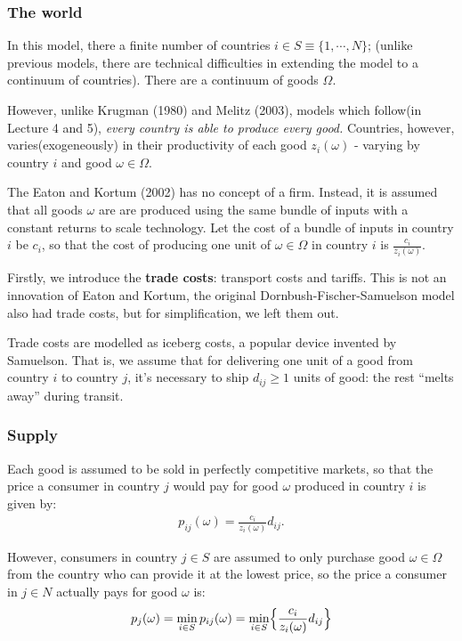 \subsubsection{The world}

In this model, there a finite number of countries $i \in S \equiv \{1, \cdots, N\}$; 
(unlike previous models, there are technical difficulties in extending the model to a continuum of countries).
There are a continuum of goods $\Omega$.

However, unlike Krugman (1980)\cite{krugman1980scale} and Melitz (2003)\cite{melitz2003impact}, models which follow(in Lecture 4 and 5),
\textit{every country is able to produce every good.}
Countries, however, varies(exogeneously) in their productivity of each good $z_i(\omega)$ - varying by country $i$ and good $\omega \in \Omega$.

The Eaton and Kortum (2002)\cite{eaton2002technology} has no concept of a firm. Instead, it is assumed that all
goods $\omega$ are are produced using the same bundle of inputs with a constant returns to
scale technology. Let the cost of a bundle of inputs in country $i$ be $c_i$,
so that the cost of producing one unit of $\omega \in \Omega$ in country $i$ is $\frac{c_i}{z_i(\omega)}$.

Firstly, we introduce the \textbf{trade costs}: transport costs and tariffs. This is not an innovation of Eaton
and Kortum, the original Dornbush-Fischer-Samuelson model also had trade costs, but for simplification, we left them out.
    
Trade costs are modelled as iceberg costs, a popular device invented by Samuelson\cite{samuelson1954transfer}.
That is, we assume that for delivering one unit of a good from country $i$ to country $j$, 
it's necessary to ship $d_{ij} \geq 1$ units of good: the rest “melts away” during transit. 

\subsubsection{Supply}

Each good is assumed to be sold in perfectly competitive markets, so that the price a
consumer in country $j$ would pay for good $\omega$ produced in country $i$ is given by:
\begin{gather*}
    p_{ij}(\omega) = \frac{c_i}{z_i(\omega)} d_{ij}. \label{eq:EKprice}
\end{gather*}

However, consumers in country $j \in S$ are assumed to only purchase good $\omega \in \Omega$
from the country who can provide it at the lowest price, so the price a consumer in
$j \in N$ actually pays for good $\omega$ is:
\begin{gather*}
    p_j(\omega) = \min_{i \in S} p_{ij}(\omega) = \min _{i \in S} \Bigl\{ \frac{c_i}{z_i(\omega)} d_{ij} \Bigr\} \label{eq:EKprice2}
\end{gather*}

